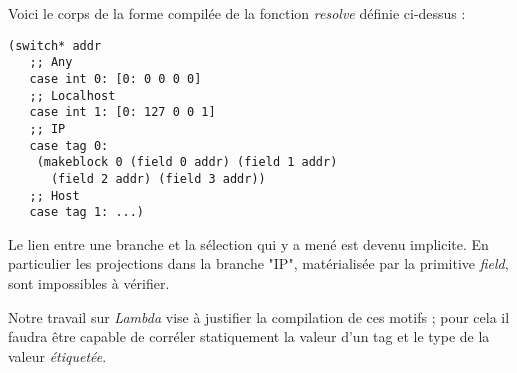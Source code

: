 Voici le corps de la forme compilée de la fonction \emph{resolve} définie
ci-dessus :

\lstset{language=Lisp}
\begin{lstlisting}
(switch* addr
   ;; Any
   case int 0: [0: 0 0 0 0]
   ;; Localhost
   case int 1: [0: 127 0 0 1]
   ;; IP
   case tag 0:
    (makeblock 0 (field 0 addr) (field 1 addr)
      (field 2 addr) (field 3 addr))
   ;; Host
   case tag 1: ...)
\end{lstlisting}
\lstset{language=Caml}

Le lien entre une branche et la sélection qui y a mené est devenu implicite.
En particulier les projections dans la branche "IP", matérialisée par la
primitive \emph{field}, sont impossibles à vérifier.

Notre travail sur \emph{Lambda} vise à justifier la compilation de ces motifs ;
pour cela il faudra être capable de corréler statiquement la valeur d'un tag et
le type de la valeur \emph{étiquetée}.
